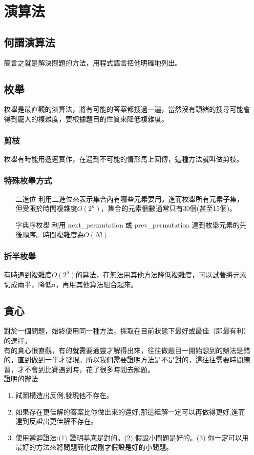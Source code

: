 \section{演算法}
\subsection{何謂演算法}
簡言之就是解決問題的方法，用程式語言把他明確地列出。
\subsection{枚舉}
枚舉是最直觀的演算法，將有可能的答案都搜過一遍，當然沒有頭緒的搜尋可能會得到龐大的複雜度，要根據題目的性質來降低複雜度。
\subsubsection{剪枝}
枚舉有時能用遞迴實作，在遇到不可能的情形馬上回傳，這種方法就叫做剪枝。
\subsubsection{特殊枚舉方式}
\begin{enumerate}
\item [二進位] 利用二進位來表示集合內有哪些元素要用，進而枚舉所有元素子集，但受限於時間複雜度$O(2^n)$，集合的元素個數通常只有30個(甚至15個)。   
\item [字典序枚舉] 利用 next\_permutation 或 prev\_permutation 達到枚舉元素的先後順序。時間複雜度為$O(N!)$
\end{enumerate}
\subsubsection{折半枚舉}
有時遇到複雜度$O(2^n)$的算法，在無法用其他方法降低複雜度，可以試著將元素切成兩半，降低n，再用其他算法組合起來。
\subsection{貪心}
對於一個問題，始終使用同一種方法，採取在目前狀態下最好或最佳（即最有利）的選擇。\\
有的貪心很直觀，有的就需要通靈才解得出來，往往做題目一開始想到的辦法是錯的，直到做到一半才發現。所以我們需要證明方法是不是對的，這往往需要時間練習，才不會到比賽遇到時，花了很多時間去解題。\\
證明的辦法
\begin{enumerate}
\item 試圖構造出反例,發現他不存在。
\item 如果存在更佳解的答案比你做出來的還好,那這組解一定可以再做得更好,進而達到反證出更佳解不存在。
\item 使用遞迴證法:(1) 證明基底是對的。(2) 假設小問題是好的。(3) 你一定可以用最好的方法來將問題簡化成剛才假設是好的小問題。
\end{enumerate}
